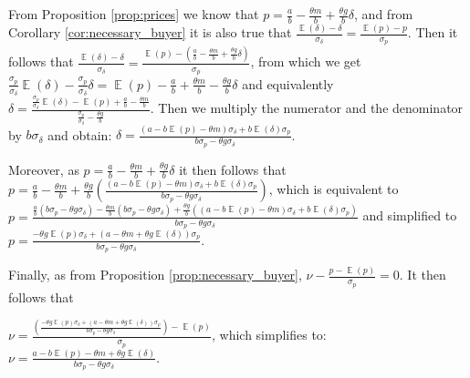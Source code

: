 \documentclass[informs]{informs3}
\begin{document}
From Proposition \ref{prop:prices} we know that $p =\frac{a}{b}-\frac{\theta m}{b}+\frac{\theta g }{b}\delta$, and from  Corollary \ref{cor:necessary_buyer} it is also true that $\frac{\mathop{\mathbb{E}}\left(\delta\right)-\delta}{\sigma_{\delta}}= \frac{\mathop{\mathbb{E}}\left(p\right)-p}{\sigma_{p}}$. Then it follows that $\frac{\mathop{\mathbb{E}}\left(\delta\right)-\delta}{\sigma_{\delta}}=\frac{\mathop{\mathbb{E}}\left(p\right)-(\frac{a}{b}-\frac{\theta m}{b}+\frac{\theta g }{b}\delta)}{\sigma_{p}}$, from which we get 
$\frac{\sigma_{p}}{\sigma_{\delta}}\mathop{\mathbb{E}}\left(\delta\right)-\frac{\sigma_{p}}{\sigma_{\delta}}\delta=\mathop{\mathbb{E}}\left(p\right)-\frac{a}{b}+\frac{\theta m}{b}-\frac{\theta g }{b}\delta$ and equivalently
$\delta=\frac{\frac{\sigma_{p}}{\sigma_{\delta}}\mathop{\mathbb{E}}\left(\delta\right)-\mathop{\mathbb{E}}\left(p\right)+\frac{a}{b}-\frac{\theta m}{b}}{\frac{\sigma_{p}}{\sigma_{\delta}}-\frac{\theta g }{b}}$. Then we multiply the numerator and the denominator by $b\sigma_{\delta}$ and obtain:
$\delta=\frac{\left(a-b\mathop{\mathbb{E}}\left(p\right) -\theta m\right)\sigma_{\delta}+b\mathop{\mathbb{E}}\left(\delta\right)\sigma_{p}}{b\sigma_{p}-\theta g\sigma_{\delta}}$.

Moreover, as $p =\frac{a}{b}-\frac{\theta m}{b}+\frac{\theta g }{b}\delta$ it then follows that $p =\frac{a}{b}-\frac{\theta m}{b}+\frac{\theta g }{b}\left(   \frac{\left(a-b\mathop{\mathbb{E}}\left(p\right) -\theta m\right)\sigma_{\delta}+b\mathop{\mathbb{E}}\left(\delta\right)\sigma_{p}}{b\sigma_{p}-\theta g\sigma_{\delta}}  \right) $, which is equivalent to
$p =\frac{\frac{a}{b}\left(b\sigma_{p}-\theta g\sigma_{\delta}\right)-\frac{\theta m}{b}\left(b\sigma_{p}-\theta g\sigma_{\delta}\right)+\frac{\theta g }{b}\left(   \left(a-b\mathop{\mathbb{E}}\left(p\right) -\theta m\right)\sigma_{\delta}+b\mathop{\mathbb{E}}\left(\delta\right)\sigma_{p}\right)}{b\sigma_{p}-\theta g\sigma_{\delta}}$ and simplified to
$p =\frac{-\theta g \mathop{\mathbb{E}}\left(p\right)\sigma_{\delta}+\left(a-\theta m+\theta g \mathop{\mathbb{E}}\left(\delta\right)\right)\sigma_{p}}{b\sigma_{p}-\theta g\sigma_{\delta}}$.

Finally, as from Proposition \ref{prop:necessary_buyer},
$\nu - \frac{p-\mathop{\mathbb{E}}\left(p\right)}{\sigma_{p}}=0$. It then follows that

$\nu = \frac{\left(\frac{-\theta g \mathop{\mathbb{E}}\left(p\right)\sigma_{\delta}+\left(a-\theta m+\theta g \mathop{\mathbb{E}}\left(\delta\right)\right)\sigma_{p}}{b\sigma_{p}-\theta g\sigma_{\delta}} \right)-\mathop{\mathbb{E}}\left(p\right)}{\sigma_{p}}$, which simplifies to:
$\nu =\frac{a-b \mathop{\mathbb{E}}\left(p\right)-\theta m+\theta g \mathop{\mathbb{E}}\left(\delta\right)}{b\sigma_{p}-\theta g\sigma_{\delta}}$.
\Halmos
\endproof 
\end{document}
